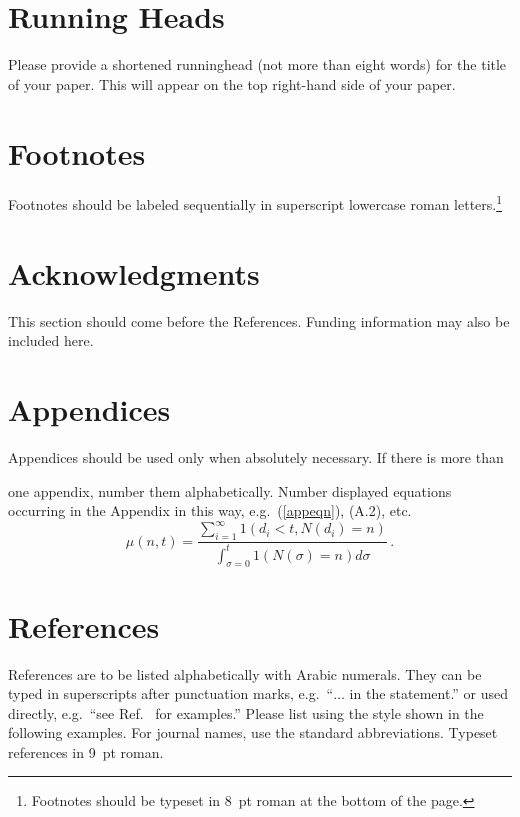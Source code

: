 \documentclass{ws-ijprai}
\begin{document}
\section{Running Heads}

Please provide a shortened runninghead (not more than eight words) for
the title of your paper. This will appear on the top right-hand side
of your paper.

\section{Footnotes}

Footnotes should be labeled sequentially in superscript lowercase
roman letters.\footnote{Footnotes should be typeset in 8~pt roman at
the bottom of the page.}

\section*{Acknowledgments}

This section should come before the References. Funding
information may also be included here.

\appendix

\section{Appendices}

Appendices should be used only when absolutely necessary. If there is
more than\break

\pagebreak

\noindent
one appendix, number them alphabetically. Number displayed
equations occurring in the Appendix in this way, e.g.~(\ref{appeqn}),
(A.2), etc.
\begin{equation}
\mu(n, t) = \frac{\sum^\infty_{i=1} 1(d_i < t, N(d_i)
= n)}{\int^t_{\sigma=0} 1(N(\sigma) = n)d\sigma}\,.
\label{appeqn}
\end{equation}

\section*{References}

References are to be listed alphabetically with Arabic numerals.  They
can be typed in superscripts after punctuation marks, e.g.~``$\ldots$
in the statement.\cite{joliat}'' or used directly, e.g.~``see
Ref.~ for examples.'' Please list using the style shown
in the following examples.  For journal names, use the standard
abbreviations. Typeset references in 9~pt roman.
\end{document}
